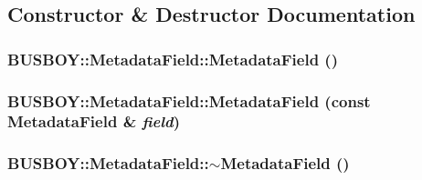 \subsection{Constructor \& Destructor Documentation}
\hypertarget{classBUSBOY_1_1MetadataField_a3bb29a5002fca022980a43139255d294}{
\subsubsection[{MetadataField}]{\setlength{\rightskip}{0pt plus 5cm}BUSBOY::MetadataField::MetadataField ()}}
\label{classBUSBOY_1_1MetadataField_a3bb29a5002fca022980a43139255d294}
\hypertarget{classBUSBOY_1_1MetadataField_ac1fdbfa0b54847131113f9eac111c920}{
\subsubsection[{MetadataField}]{\setlength{\rightskip}{0pt plus 5cm}BUSBOY::MetadataField::MetadataField (const {\bf MetadataField} \& {\em field})}}
\label{classBUSBOY_1_1MetadataField_ac1fdbfa0b54847131113f9eac111c920}
\hypertarget{classBUSBOY_1_1MetadataField_af83bd45ed390faa432cde8a6b2b1bc48}{
\subsubsection[{$\sim$MetadataField}]{\setlength{\rightskip}{0pt plus 5cm}BUSBOY::MetadataField::$\sim$MetadataField ()}}
\label{classBUSBOY_1_1MetadataField_af83bd45ed390faa432cde8a6b2b1bc48}


